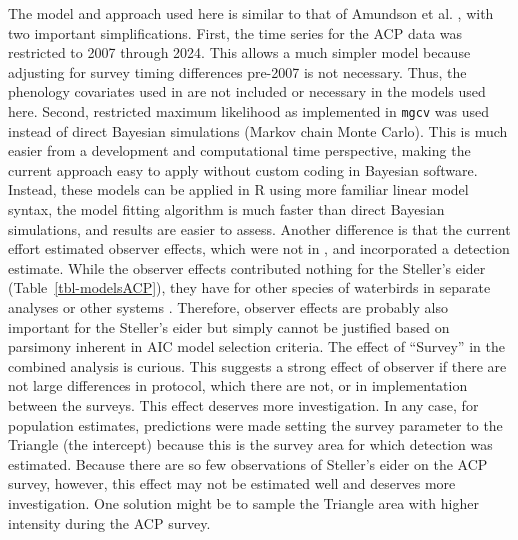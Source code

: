 \documentclass[
  10pt,
  letterpaper,
]{article}
\begin{document}
The model and approach used here is similar to that of Amundson et al. 
\citep{amundson2019}, with two important simplifications. First, the
time series for the ACP data was restricted to 2007 through 2024. This
allows a much simpler model because adjusting for survey timing
differences pre-2007 is not necessary. Thus, the phenology covariates
used in \citep{amundson2019} are not included or necessary in the models
used here. Second, restricted maximum likelihood as implemented in
\texttt{mgcv} \citep{wood2011fast} was used instead of direct Bayesian
simulations (Markov chain Monte Carlo). This is much easier from a
development and computational time perspective, making the current
approach easy to apply without custom coding in Bayesian software.
Instead, these models can be applied in R using more familiar linear
model syntax, the model fitting algorithm is much faster than direct
Bayesian simulations, and results are easier to assess. Another
difference is that the current effort estimated observer effects, which
were not in \citep{amundson2019}, and incorporated a detection estimate.
While the observer effects contributed nothing for the Steller's eider
(Table~\ref{tbl-modelsACP}), they have for other species of waterbirds
in separate analyses \citep{wilson2025population} or other systems
\citep{sauer1994observer, fink2023double}. Therefore, observer
effects are probably also important for the Steller's eider but simply
cannot be justified based on parsimony inherent in AIC model selection
criteria. The effect of ``Survey'' in the combined analysis is curious.
This suggests a strong effect of observer if there are not large
differences in protocol, which there are not, or in implementation
between the surveys. This effect deserves more investigation. In any
case, for population estimates, predictions were made setting the survey
parameter to the Triangle (the intercept) because this is the survey
area for which detection was estimated. Because there are so few
observations of Steller's eider on the ACP survey, however, this effect
may not be estimated well and deserves more investigation. One solution
might be to sample the Triangle area with higher intensity during the
ACP survey.
\end{document}
